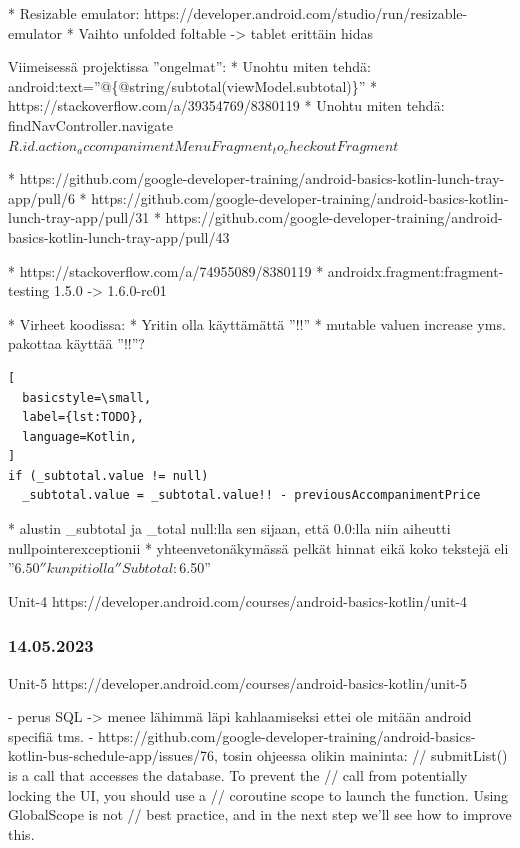 * Resizable emulator: https://developer.android.com/studio/run/resizable-emulator
* Vaihto unfolded foltable -> tablet erittäin hidas

Viimeisessä projektissa ''ongelmat'':
* Unohtu miten tehdä: android:text=''@\{@string/subtotal(viewModel.subtotal)\}''
  * https://stackoverflow.com/a/39354769/8380119
* Unohtu miten tehdä: findNavController\(\).navigate\(R.id.action_accompanimentMenuFragment_to_checkoutFragment\)

* https://github.com/google-developer-training/android-basics-kotlin-lunch-tray-app/pull/6
* https://github.com/google-developer-training/android-basics-kotlin-lunch-tray-app/pull/31
* https://github.com/google-developer-training/android-basics-kotlin-lunch-tray-app/pull/43

* https://stackoverflow.com/a/74955089/8380119
* androidx.fragment:fragment-testing 1.5.0 -> 1.6.0-rc01

* Virheet koodissa:
  * Yritin olla käyttämättä ''!!''
    * mutable valuen increase yms. pakottaa käyttää ''!!''?

\begin{lstlisting}[
  basicstyle=\small,
  label={lst:TODO},
  language=Kotlin,
]
if (_subtotal.value != null)
  _subtotal.value = _subtotal.value!! - previousAccompanimentPrice
\end{lstlisting}

  * alustin \_subtotal ja \_total null:lla sen sijaan, että 0.0:lla niin aiheutti nullpointerexceptionii
  * yhteenvetonäkymässä pelkät hinnat eikä koko tekstejä eli ''$6.50'' kun piti olla ''Subtotal: $6.50''

Unit-4 https://developer.android.com/courses/android-basics-kotlin/unit-4

\subsubsection{14.05.2023}

Unit-5 https://developer.android.com/courses/android-basics-kotlin/unit-5

- perus SQL -> menee lähimmä läpi kahlaamiseksi ettei ole mitään android specifiä tms.
- https://github.com/google-developer-training/android-basics-kotlin-bus-schedule-app/issues/76, tosin ohjeessa olikin maininta:
// submitList() is a call that accesses the database. To prevent the
// call from potentially locking the UI, you should use a
// coroutine scope to launch the function. Using GlobalScope is not
// best practice, and in the next step we'll see how to improve this.

